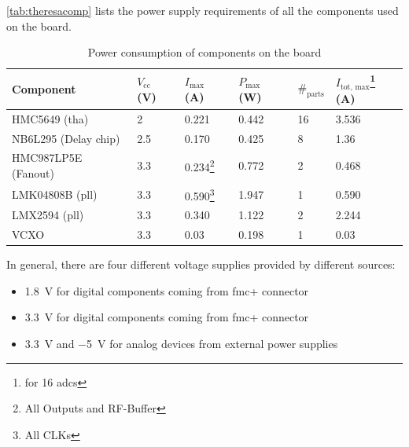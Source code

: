 \autoref{tab:theresacomp} lists the power supply requirements of all the components used on the board.

\begin{table}[H]
	\caption{Power consumption of components on the board}
	\label{tab:theresacomp}
	\begin{minipage}{\textwidth}
		\centering
		\begin{tabularx}{\textwidth}{Xlllll}
			\toprule
			\textbf{Component}         & $V_\text{cc}$ (V) & $I_\text{max}$ (A)                        & $P_\text{max}$ (W) & $\#_\text{parts}$ & $I_\text{tot, max}$\footnote{for 16 \glspl{adc}} (A) \\ \midrule
			HMC5649 (\gls{tha})        & 2                 & 0.221                                     & 0.442              & 16                & 3.536                                                \\
			NB6L295 (Delay chip)       & 2.5               & 0.170                                     & 0.425              & 8                 & 1.36                                                 \\
			HMC987LP5E (Fanout) & 3.3               & 0.234\footnote{All Outputs and RF-Buffer} & 0.772              & 2                 & 0.468                                                \\
			LMK04808B (\gls{pll})      & 3.3               & 0.590\footnote{All CLKs}                  & 1.947              & 1                 & 0.590                                                \\
			LMX2594 (\gls{pll})        & 3.3               & 0.340                                     & 1.122              & 2                 & 2.244                                                \\
			VCXO                       & 3.3               & 0.03                                      & 0.198              & 1                 & 0.03                                                 \\ \bottomrule
		\end{tabularx}
	\end{minipage}
\end{table}
In general, there are four different voltage supplies provided by different sources:
\begin{itemize}
	\item \SI{1.8}{\volt} for digital components coming from \gls{fmc}+ connector
	\item \SI{3.3}{\volt} for digital components coming from \gls{fmc}+ connector
	\item \SI{3.3}{\volt} and \SI{-5}{\volt} for analog devices from external power supplies 
\end{itemize}
